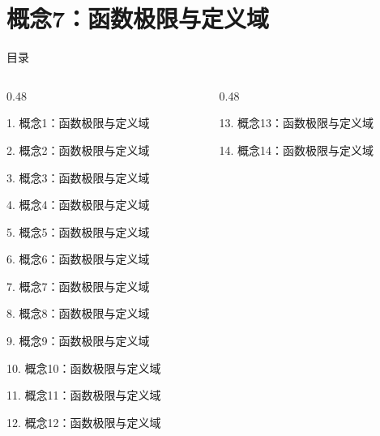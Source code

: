 \documentclass[aspectratio=169,10pt,fontset=fandol]{ctexbeamer}
\begin{document}
\section{概念7：函数极限与定义域}
\begin{frame}[t,fragile]{目录}
\small
\begin{columns}[T,onlytextwidth]
\begin{column}{0.48\textwidth}
{\color{black}\small 1. 概念1：函数极限与定义域\par}\vspace{0.22em}
{\color{black}\small 2. 概念2：函数极限与定义域\par}\vspace{0.22em}
{\color{black}\small 3. 概念3：函数极限与定义域\par}\vspace{0.22em}
{\color{black}\small 4. 概念4：函数极限与定义域\par}\vspace{0.22em}
{\color{black}\small 5. 概念5：函数极限与定义域\par}\vspace{0.22em}
{\color{black}\small 6. 概念6：函数极限与定义域\par}\vspace{0.22em}
{\color{blue}\small 7. 概念7：函数极限与定义域\par}\vspace{0.22em}
{\color{gray!40}\small 8. 概念8：函数极限与定义域\par}\vspace{0.22em}
{\color{gray!40}\small 9. 概念9：函数极限与定义域\par}\vspace{0.22em}
{\color{gray!40}\small 10. 概念10：函数极限与定义域\par}\vspace{0.22em}
{\color{gray!40}\small 11. 概念11：函数极限与定义域\par}\vspace{0.22em}
{\color{gray!40}\small 12. 概念12：函数极限与定义域\par}\vspace{0.22em}
\end{column}
\begin{column}{0.48\textwidth}
{\color{gray!40}\small 13. 概念13：函数极限与定义域\par}\vspace{0.22em}
{\color{gray!40}\small 14. 概念14：函数极限与定义域\par}\vspace{0.22em}

\end{column}
\end{columns}
\end{frame}
\end{document}
